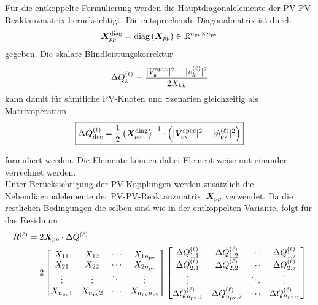 Für die entkoppelte Formulierung werden die
Hauptdiagonalelemente der PV-PV-Reaktanzmatrix berücksichtigt. Die
entsprechende Diagonalmatrix ist durch
\begin{equation}
	\boldsymbol{X}_{pp}^{\mathrm{diag}}
	=
	\operatorname{diag}
	\left(
	\boldsymbol{X}_{pp}
	\right)
	\in
	\mathbb{R}^{n_{\mathrm{pv}}\times n_{\mathrm{pv}}}
	\label{eq:dense_Xpp_diag}
\end{equation}
gegeben.
Die skalare Blindleistungskorrektur
\begin{equation}
	\Delta Q_k^{(\ell)}
	=
	\frac{
		|V_k^{\mathrm{spec}}|^2
		-
		|v_k^{(\ell)}|^2
	}{
		2X_{kk}
	}
	\label{eq:dense_scalar_decoupled}
\end{equation}
kann damit für sämtliche PV-Knoten und Szenarien gleichzeitig als
Matrixoperation 
\begin{equation}
	\boxed{
		\Delta\dot{\boldsymbol{Q}}_{\mathrm{dec}}^{(\ell)}
		=
		\frac{1}{2}
		\left(
		\boldsymbol{X}_{pp}^{\mathrm{diag}}
		\right)^{-1}
		\cdot
		\left(
		|\dot{\boldsymbol{V}}_{\mathrm{pv}}^{\mathrm{spec}}|^2
		-
		|\dot{\boldsymbol{v}}_{\mathrm{pv}}^{(\ell)}|^2
		\right)
	}
	\label{eq:dense_decoupled_Q}
\end{equation}

formuliert werden.
Die Elemente können dabei Element-weise mit einander verrechnet werden.\\

Unter Berücksichtigung der PV-Kopplungen 
werden zusätzlich die Nebendiagonalelemente der
PV-PV-Reaktanzmatrix~$\boldsymbol{X}_{pp}$ verwendet.
Da die restlichen Bedingungen die selben sind wie in der entkoppelten Variante, folgt für das Residuum
\begin{align}
	\dot{{R}}^{(\ell)}
	&=
	2\boldsymbol{X}_{pp}
	\cdot
	\Delta\dot{{Q}}^{(\ell)}\\
	&=
	2
	\begin{bmatrix}
		X_{11} & X_{12} & \cdots & X_{1n_{\mathrm{pv}}}\\
		X_{21} & X_{22} & \cdots & X_{2n_{\mathrm{pv}}}\\
		\vdots & \vdots & \ddots & \vdots\\
		X_{n_{\mathrm{pv}}1}
		&
		X_{n_{\mathrm{pv}}2}
		&
		\cdots
		&
		X_{n_{\mathrm{pv}}n_{\mathrm{pv}}}
	\end{bmatrix}
	\begin{bmatrix}
		\Delta Q_{1,1}^{(\ell)}
		&
		\Delta Q_{1,2}^{(\ell)}
		&
		\cdots
		&
		\Delta Q_{1,\tau}^{(\ell)}
		\\
		\Delta Q_{2,1}^{(\ell)}
		&
		\Delta Q_{2,2}^{(\ell)}
		&
		\cdots
		&
		\Delta Q_{2,\tau}^{(\ell)}
		\\
		\vdots
		&
		\vdots
		&
		\ddots
		&
		\vdots
		\\
		\Delta Q_{n_{\mathrm{pv}},1}^{(\ell)}
		&
		\Delta Q_{n_{\mathrm{pv}},2}^{(\ell)}
		&
		\cdots
		&
		\Delta Q_{n_{\mathrm{pv}},\tau}^{(\ell)}
	\end{bmatrix}
	\label{eq:dense_coupled_sensitivity}
\end{align}

